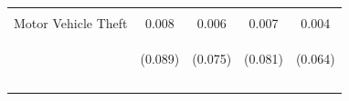 \begin{center}
\begin{tabular}{lcccc}
 & \begin{footnotesize}\end{footnotesize} & \begin{footnotesize}\end{footnotesize} & \begin{footnotesize}\end{footnotesize} & \begin{footnotesize}\end{footnotesize}\\
\noalign{\smallskip}Motor Vehicle Theft & 0.008 & 0.006 & 0.007 & 0.004\\
 & \begin{footnotesize}(0.089)\end{footnotesize} & \begin{footnotesize}(0.075)\end{footnotesize} & \begin{footnotesize}(0.081)\end{footnotesize} & \begin{footnotesize}(0.064)\end{footnotesize}\\
 & \begin{footnotesize}\end{footnotesize} & \begin{footnotesize}\end{footnotesize} & \begin{footnotesize}\end{footnotesize} & \begin{footnotesize}\end{footnotesize}\\
\noalign{\smallskip}\hline\end{tabular}\\
\end{center}
